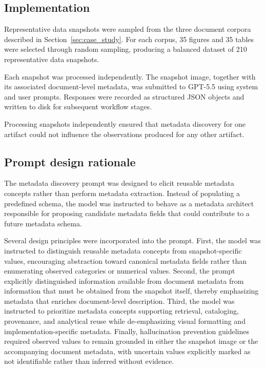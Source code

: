 \documentclass{article}
\begin{document}
\subsection{Implementation}

Representative data snapshots were sampled from the three document corpora described in Section~\ref{sec:case_study}. For each corpus, 35 figures and 35 tables were selected through random sampling, producing a balanced dataset of 210 representative data snapshots.

Each snapshot was processed independently. The snapshot image, together with its associated document-level metadata, was submitted to GPT-5.5 using system and user prompts. Responses were recorded as structured JSON objects and written to disk for subsequent workflow stages.

Processing snapshots independently ensured that metadata discovery for one artifact could not influence the observations produced for any other artifact.

\subsection{Prompt design rationale}

The metadata discovery prompt was designed to elicit reusable metadata concepts rather than perform metadata extraction. Instead of populating a predefined schema, the model was instructed to behave as a metadata architect responsible for proposing candidate metadata fields that could contribute to a future metadata schema.

Several design principles were incorporated into the prompt. First, the model was instructed to distinguish reusable metadata concepts from snapshot-specific values, encouraging abstraction toward canonical metadata fields rather than enumerating observed categories or numerical values. Second, the prompt explicitly distinguished information available from document metadata from information that must be obtained from the snapshot itself, thereby emphasizing metadata that enriches document-level description. Third, the model was instructed to prioritize metadata concepts supporting retrieval, cataloging, provenance, and analytical reuse while de-emphasizing visual formatting and implementation-specific metadata. Finally, hallucination prevention guidelines required observed values to remain grounded in either the snapshot image or the accompanying document metadata, with uncertain values explicitly marked as not identifiable rather than inferred without evidence.
\end{document}

